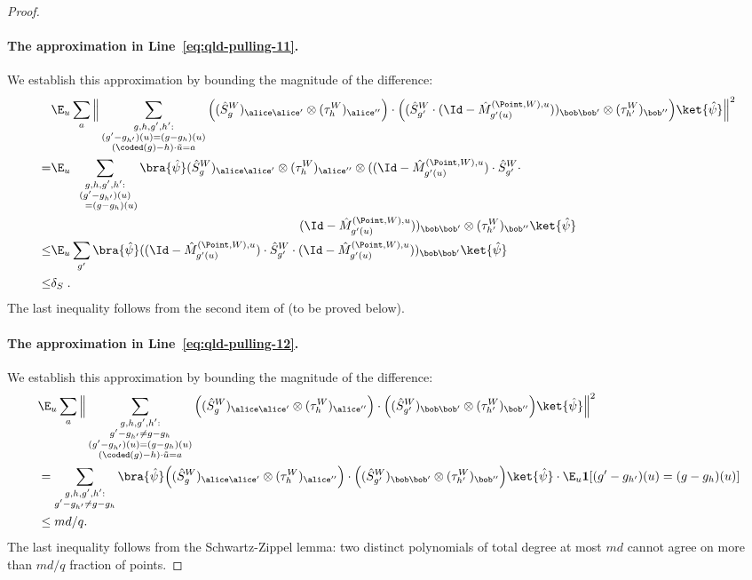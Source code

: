 \begin{proof}
\paragraph{The approximation in Line~\eqref{eq:qld-pulling-11}.} We establish this approximation by bounding the magnitude of the difference:
\begin{align*}
	&\E_u \sum_a \Big \| \sum_{\substack{g,h,g',h': \\ (g' - g_{h'})(u) = (g -g_h)(u) \\ (\coded(g)-h)\cdot \tilde{u} = a}} \Big((\hat{S}^W_g)_{\alice \alice'} \otimes (\tau_h^W)_{\alice''} \Big) \cdot \Big( (\hat{S}^W_{g'} \cdot (\Id - \hat{M}^{(\Point,W),u}_{g'(u)}))_{\bob \bob'} \otimes (\tau_{h'}^W)_{\bob''} \Big) \ket{\hat{\psi}} \Big \|^2 \\
	=& \E_u \sum_{\substack{g,h,g',h': \\ (g' - g_{h'})(u) \\ \quad = (g -g_h)(u)}} \bra{\hat{\psi}} (\hat{S}^W_g)_{\alice \alice'} \otimes (\tau_h^W)_{\alice''} \otimes ((\Id - \hat{M}^{(\Point,W),u}_{g'(u)}) \cdot \hat{S}^W_{g'} \cdot \notag \\
  &\hspace{20em}(\Id - \hat{M}^{(\Point,W),u}_{g'(u)}))_{\bob \bob'} \otimes (\tau_{h'}^W)_{\bob''} \ket{\hat{\psi}}  \\
	\leq& \E_u \sum_{g'} \bra{\hat{\psi}} ((\Id - \hat{M}^{(\Point,W),u}_{g'(u)}) \cdot \hat{S}^W_{g'} \cdot (\Id - \hat{M}^{(\Point,W),u}_{g'(u)}))_{\bob \bob'} \ket{\hat{\psi}} \\
	\leq& \delta_S \;.
\end{align*}
The last inequality follows from the second item of  (to be proved below). 

\paragraph{The approximation in Line~\eqref{eq:qld-pulling-12}.} We establish this approximation by bounding the magnitude of the difference:
\begin{align*}
	&\E_u \sum_a \Big \| \sum_{\substack{g,h,g',h': \\ g' - g_{h'} \neq g -g_h \\ (g' - g_{h'})(u) = (g -g_h)(u) \\ (\coded(g)-h)\cdot \tilde{u} = a}} \Big((\hat{S}^W_g)_{\alice \alice'} \otimes (\tau_h^W)_{\alice''} \Big) \cdot \Big( (\hat{S}^W_{g'})_{\bob \bob'} \otimes (\tau_{h'}^W)_{\bob''} \Big) \ket{\hat{\psi}} \Big \|^2 \\
	&= \sum_{\substack{g,h,g',h': \\ g' - g_{h'} \neq g -g_h}} \bra{\hat{\psi}} \Big((\hat{S}^W_g)_{\alice \alice'} \otimes (\tau_h^W)_{\alice''} \Big) \cdot \Big( (\hat{S}^W_{g'})_{\bob \bob'} \otimes (\tau_{h'}^W)_{\bob''} \Big) \ket{\hat{\psi}} \cdot \E_u \mathbf{1}[(g' - g_{h'})(u) = (g -g_h)(u)] \\
	&\leq md/q.
\end{align*}
The last inequality follows from the Schwartz-Zippel lemma: two distinct polynomials of total degree at most $md$ cannot agree on more than $md/q$ fraction of points. 


\end{proof}
